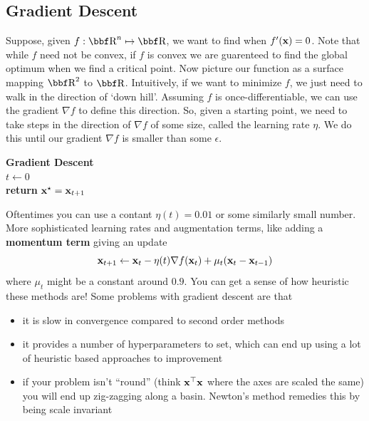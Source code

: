 \documentclass{article}
\begin{document}
\subsection{Gradient Descent}

Suppose, given $f : \RR^n \mapsto \RR$, we want to find when $f'({\bf x})=0$.
Note that while $f$ need not be convex, if $f$ is convex we are guarenteed
to find the global optimum when we find a critical point. Now picture our function
as a surface mapping $\RR^2$ to $\RR$. Intuitively, if we want to minimize
$f$, we just need to walk in the direction of `down hill'. Assuming $f$ is
once-differentiable, we can use the gradient $\nabla f$ to define this direction.
So, given a starting point, we need to take steps in the direction of $\nabla f$
of some size, called the learning rate $\eta$. We do this until our gradient
$\nabla f$ is smaller than some $\epsilon$.

\IncMargin{1em}
\begin{algorithm}
    \textbf{Gradient Descent}\\
    $t \leftarrow 0$\\
    \textbf{return } ${\bf x}^\star = {\bf x}_{t+1}$
\end{algorithm}

Oftentimes you can use a contant $\eta(t) = 0.01$ or some similarly small number.
More sophisticated learning rates and augmentation terms, like adding a \textbf{momentum
term} giving an update
\[
    {\bf x}_{t+1} \leftarrow {\bf x}_t - \eta(t)\nabla f({\bf x}_t) + \mu_t({\bf x}_t - {\bf x}_{t-1})
\]
where $\mu_t$ might be a constant around $0.9$. You can get a sense of how heuristic these
methods are!
Some problems with gradient descent are that
\begin{itemize}
    \item it is slow in convergence compared to second order methods
    \item it provides a number of hyperparameters to set, which can
        end up using a lot of heuristic based approaches to improvement
    \item if your problem isn't ``round'' (think ${\bf x}^\top{\bf x}$ where the
        axes are scaled the same) you will end up zig-zagging along a
        basin. Newton's method remedies this by being scale invariant
\end{itemize}
\end{document}
